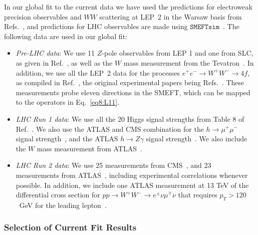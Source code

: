 \documentclass[../report.tex]{subfiles}
\begin{document}
In our global fit to the current data we have used the predictions for electroweak precision observables and $WW$ scattering at LEP~2 in the 
Warsaw basis from Refs.~\cite{Berthier:2016tkq, Brivio:2017vri}, and predictions for LHC observables are made using $\mathtt{SMEFTsim}$~\cite{Brivio:2017btx}.
The following data are used in our global fit:

\begin{itemize}
\item \textit{Pre-LHC data}:  
We use 11 $Z$-pole observables from LEP 1 and one from SLC, as given in Ref.~\cite{ALEPH:2005ab}, as well as the $W$ mass measurement from the 
Tevatron~\cite{Aaltonen:2013iut}.
In addition, we use all the LEP~2 data for the processes $e^+ e^- \to W^+ W^- \to 4f$,
as compiled in Ref.~\cite{Berthier:2016tkq}, the original experimental papers being Refs.~\cite{Heister:2004wr, Achard:2004zw, Abbiendi:2007rs, Schael:2013ita}. 
These measurements probe eleven directions in the SMEFT, which can be mapped to the operators in Eq.~\eqref{eq8:L11}.

\item \textit{LHC Run 1 data}: 
We use all the 20 Higgs signal strengths from Table 8 of Ref.~\cite{Khachatryan:2016vau}.
We also use the ATLAS and CMS combination for the $h \to \mu^+ \mu^-$ signal strength~\cite{Khachatryan:2016vau}, and the ATLAS $h \to Z \gamma$ signal strength~\cite{Aad:2015gba}. 
We also include the $W$ mass measurement from ATLAS~\cite{Aaboud:2017svj}.

\item \textit{LHC Run 2 data}: 
We use 25 measurements from CMS~\cite{Sirunyan:2017dgc, Sirunyan:2017elk, Sirunyan:2018mvw, Sirunyan:2018shy, CMS-PAS-HIG-16-042, Sirunyan:2018ouh, Sirunyan:2017exp, Sirunyan:2017khh}, and 23 measurements from ATLAS~\cite{Aaboud:2017ojs, Aaboud:2017xsd, Aaboud:2017rss, Aaboud:2017jvq, ATLAS-CONF-2018-004, ATLAS-CONF-2017-047, ATLAS-CONF-2016-112}, including experimental correlations whenever possible. 
In addition, we include one ATLAS measurement at 13 TeV of the differential cross section for $p p \to W^+ W^- \to e^{\pm} \nu \mu^{\mp} \nu$
that requires $p_T > 120$~GeV for the leading lepton~\cite{Aaboud:2017qkn}.
\end{itemize}

\subsubsection{Selection of Current Fit Results}
\label{sec8:curr}
\end{document}

